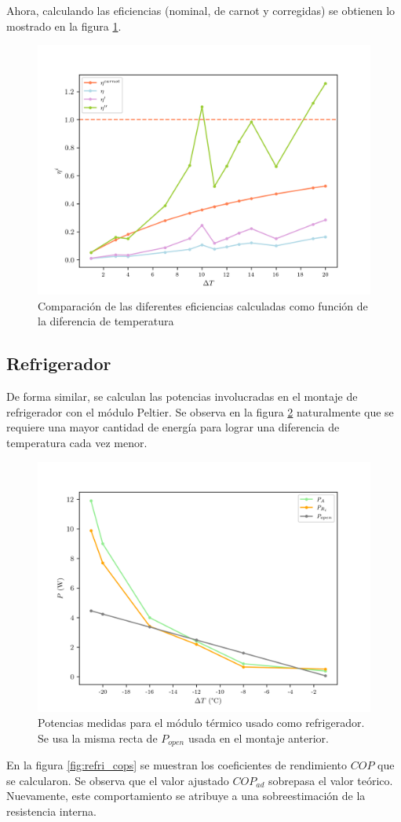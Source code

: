 Ahora, calculando las eficiencias (nominal, de carnot y corregidas) se obtienen lo mostrado en la figura \ref{fig:etas}. 

\begin{figure}[ht]
    \centering
    \includegraphics[width = 0.6\linewidth]{img/gen_etas.png}
    \caption{Comparación de las diferentes eficiencias calculadas como función de la diferencia de temperatura}
    \label{fig:etas}
\end{figure}

\subsection{Refrigerador}

De forma similar, se calculan las potencias involucradas en el montaje de refrigerador con el módulo Peltier. Se observa en la figura \ref{fig:refri_powers} naturalmente que se requiere una mayor cantidad de energía para lograr una diferencia de temperatura cada vez menor. 

\begin{figure}[ht]
    \centering
    \includegraphics[width = 0.5\linewidth]{img/refri_powers.png}
    \caption{Potencias medidas para el módulo térmico usado como refrigerador. Se usa la misma recta de $P_{open}$ usada en el montaje anterior.}
    \label{fig:refri_powers}
\end{figure}

En la figura \ref{fig:refri_cops} se muestran los coeficientes de rendimiento $COP$ que se calcularon. Se observa que el valor ajustado $COP_{ad}$ sobrepasa el valor teórico. Nuevamente, este comportamiento se atribuye a una sobreestimación de la resistencia interna.

